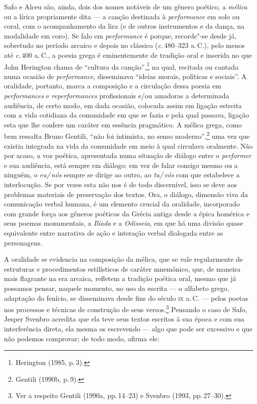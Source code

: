 Safo e Alceu são, ainda, dois dos nomes notáveis de um gênero poético, a
\emph{mélica} ou a lírica propriamente dita --- a canção destinada à
\emph{performance} em solo ou coral,
com o acompanhamento da lira (e de outros instrumentos e da dança, na
modalidade em coro). Se falo em \emph{performance} é porque, recorde"-se
desde já, sobretudo no período arcaico e depois no clássico (\emph{c.}\,480--323 a.\,C.), pelo menos até \emph{c}.\,400 a.\,C., a poesia grega é eminentemente de tradição oral e inserida no
que John Herington chama de ``cultura da canção'',\footnote{ Herington (1985, p.\,3).} na
qual, recitada ou cantada numa ocasião de \emph{performance}, disseminava
“ideias morais, políticas e sociais”. A oralidade, portanto, marca
a composição e a circulação dessa poesia em \emph{performances} e
\emph{reperformances} profissionais e/ou amadoras a determinada
audiência, de certo modo, em dada ocasião, colocada assim em ligação estreita
com a vida cotidiana da comunidade em que se fazia e pela qual passava, ligação
esta que lhe confere um caráter em essência pragmático. A mélica grega,
como bem ressalta Bruno Gentili, “não foi intimista, no senso
moderno”,\footnote{ Gentili (1990b, p.\,9).} uma vez que existia integrada na
vida da comunidade em meio à qual
circulava oralmente. Não por acaso, a voz poética, apresentada numa
situação de diálogo entre o \emph{performer} e sua audiência, está sempre em
diálogo: em vez de falar consigo mesmo ou a ninguém, o \emph{eu/\,nós} sempre
se dirige ao outro, ao \emph{tu/\,vós} com que estabelece a interlocução. Se por
vezes esta não nos é de todo discernível, isso se deve aos problemas
materiais de preservação dos textos. Ora, o diálogo, dimensão viva da
comunicação verbal humana, é um elemento crucial da oralidade, incorporado com
grande força aos gêneros poéticos da Grécia antiga desde a épica homérica e
seus poemas monumentais, a \emph{Ilíada} e a \emph{Odisseia}, em que há uma
divisão quase equivalente entre narrativa de ação e interação verbal dialogada entre as personagens. 

A oralidade se evidencia na composição da mélica, que se vale regularmente de
estruturas e procedimentos estilísticos de caráter mnemônico, que,
de maneira mais flagrante na era arcaica, refletem a tradição poética oral,
mesmo que já possamos pensar, naquele momento, no uso da escrita --- o alfabeto
grego, adaptação do fenício, se disseminava desde fins do século \textsc{ix} a.\,C. --- pelos poetas nos processos e técnicas de construção de seus
versos.\footnote{ Ver a respeito Gentili (1990a, pp.\,14--23) e Svenbro (1993, pp.\,27--30).} Pensando o caso de Safo, Jesper Svenbro acredita
que ela teve seus textos escritos à sua época e com sua interferência direta,
ela mesma os escrevendo --- algo que pode ser excessivo e que não podemos
comprovar; de todo modo, afirma ele:

